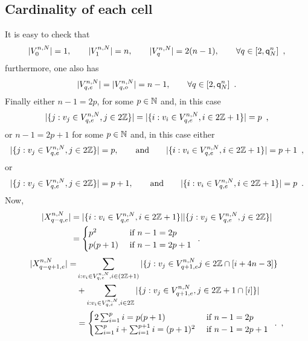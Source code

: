 \subsection{Cardinality of each cell}
It is easy to check that 
\[
|V_{0}^{n,N}|=1, \qquad |V_{1}^{n,N}|=n,\qquad |V_{q}^{n,N}|=2(n-1),\qquad\forall q\in[2,{\mathsf{q}}^{n}_{N}]\enspace,
\]
furthermore, one also has
\[
|V_{q,e}^{n,N}|=|V_{q,o}^{n,N}|=n-1,\qquad \forall q\in [2,{\mathsf{q}}^{n}_{N}]\enspace.
\]
Finally either $n-1=2p$, for some $p\in \mathbb{N}$ and, in this case 
\[
|\{j: v_j\in V_{q,e}^{n,N},j\in 2\mathbb{Z}\}|=|\{i : v_i\in V_{q,e}^{n,N},i\in 2\mathbb{Z}+1\}|=p\enspace,
\]
or $n-1=2p+1$ for some $p\in \mathbb{N}$ and, in this case either 
\[
|\{j: v_j\in V_{q,e}^{n,N},j\in 2\mathbb{Z}\}|=p,\qquad\text{and}\qquad |\{i : v_i\in V_{q,e}^{n,N},i\in 2\mathbb{Z}+1\}|=p+1\enspace,
\]
or 
\[
|\{j: v_j\in V_{q,e}^{n,N},j\in 2\mathbb{Z}\}|=p+1,\qquad\text{and}\qquad |\{i : v_i\in V_{q,e}^{n,N},i\in 2\mathbb{Z}+1\}|=p\enspace.
\]
Now,
\begin{align*}
|X_{q- q,e}^{n,N}|&=|\{i : v_i\in V_{q,e}^{n,N},i\in 2\mathbb{Z}+1\}||\{j: v_j\in V_{q,e}^{n,N},j\in 2\mathbb{Z}\}|\\
&=
\begin{cases}
 p^2&\text{ if }n-1=2p\\
 p(p+1)&\text{ if }n-1=2p+1
\end{cases}
\enspace. 
\end{align*}
\begin{align*}
|X_{q- q+1,e}^{n,N}|=&\sum_{i : v_i\in V_{q,e}^{n,N},i\in(2\mathbb{Z}+1)}|\{j : v_j\in V_{q+1,e}^{n,N}j\in 2\mathbb{Z}\cap [i+4n-3]\}\\
&+\sum_{i : v_i\in V_{q,e}^{n,N},i\in 2\mathbb{Z}}|\{j: v_j\in V_{q+1,e}^{n,N},j\in 2\mathbb{Z}+1\cap [i]\}|\\
&=
\begin{cases}
2\sum_{i=1}^pi=p(p+1) &\text{ if }n-1=2p\\
\sum_{i=1}^pi+\sum_{i=1}^{p+1}i=(p+1)^2 &\text{ if }n-1=2p+1
\end{cases}
\enspace.
\enspace,
\end{align*}



